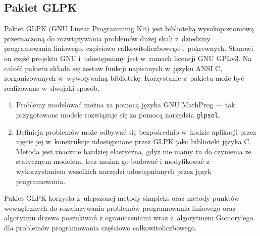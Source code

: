 \subsection{Pakiet GLPK} %
\label{ss_internals_glpk}
\par{
  Pakiet GLPK (GNU Linear Programming Kit) jest biblioteką wysokopoziomową przeznaczoną do rozwiązywania problemów dużej skali z~dziedziny programowania liniowego, częściowo całkowitoliczbowego i~pokrewnych.
  Stanowi on część projektu GNU i~udostępniany jest w~ramach licencji GNU GPLv3.
  Na całość pakietu składa się zestaw funkcji napisanych w~języku ANSI C, zorganizowanych w~wywoływalną bibliotekę.
  Korzystanie z~pakietu może być realizowane w~dwojaki sposób.
  \begin{enumerate}
    \item Problemy modelować można za pomocą języka GNU MathProg --- tak przygotowane modele rozwiązuje się za pomocą narzędzia \texttt{glpsol}.
    \item Definicja problemów może odbywać się bezpośrednio w~kodzie aplikacji przez ujęcie jej w~konstrukcje udostępniane przez GLPK jako biblioteki języka C. Metoda jest znacznie bardziej elastyczna, gdyż nie mamy tu do czynienia ze statycznym modelem, lecz można go budować i modyfikować z wykorzystaniem wszelkich narzędzi udostępnianych przez język programowania.
  \end{enumerate}
}
\par{
  Pakiet GLPK korzysta z~ulepszonej metody simpleks oraz metody punktów wewnętrznych do rozwiązywania problemów programowania liniowego oraz algorytmu drzewa poszukiwań z ograniczeniami wraz z~algorytmem Gomory'ego dla problemów programowania częściowo całkowitoliczbowego.
}
